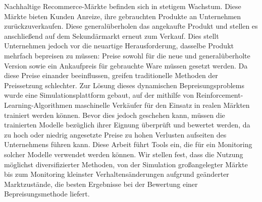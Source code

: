 Nachhaltige Recommerce-Märkte befinden sich in stetigem Wachstum. Diese Märkte bieten Kunden Anreize, ihre gebrauchten Produkte an Unternehmen zurückzuverkaufen. Diese generalüberholen das angekaufte Produkt und stellen es anschließend auf dem Sekundärmarkt erneut zum Verkauf. Dies stellt Unternehmen jedoch vor die neuartige Herausforderung, dasselbe Produkt mehrfach bepreisen zu müssen: Preise sowohl für die neue und generalüberholte Version sowie ein Ankaufpreis für gebrauchte Ware müssen gesetzt werden. Da diese Preise einander beeinflussen, greifen traditionelle Methoden der Preissetzung schlechter. Zur Lösung dieses dynamischen Bepreisungsproblems wurde eine Simulationsplattform gebaut, auf der mithilfe von Reinforcement-Learning-Algorithmen maschinelle Verkäufer für den Einsatz in realen Märkten trainiert werden können. Bevor dies jedoch geschehen kann, müssen die trainierten Modelle bezüglich ihrer Eignung überprüft und bewertet werden, da zu hoch oder niedrig angesetzte Preise zu hohen Verlusten aufseiten des Unternehmens führen kann. Diese Arbeit führt Tools ein, die für ein Monitoring solcher Modelle verwendet werden können. Wir stellen fest, dass die Nutzung möglichst diversifizierter Methoden, von der Simulation großangelegter Märkte bis zum Monitoring kleinster Verhaltensänderungen aufgrund geänderter Marktzustände, die besten Ergebnisse bei der Bewertung einer Bepreisungsmethode liefert.